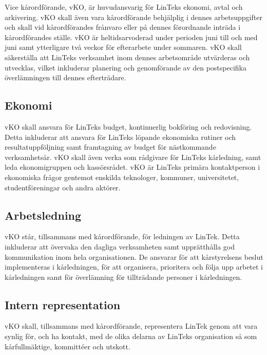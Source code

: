 Vice kårordförande, vKO, är huvudansvarig för LinTeks ekonomi, avtal och
arkivering. vKO skall även vara kårordförande behjälplig i dennes
arbetsuppgifter och skall vid kårordförandes frånvaro eller på dennes
förordnande inträda i kårordförandes ställe. vKO är heltidsarvoderad
under perioden juni till och med juni samt ytterligare två veckor för
efterarbete under sommaren. vKO skall säkerställa att LinTeks verksamhet
inom dennes arbetsområde utvärderas och utvecklas, vilket inkluderar
planering och genomförande av den postspecifika överlämningen till
dennes efterträdare.

\hypertarget{ekonomi}{%
\subsection{Ekonomi}\label{ekonomi}}

vKO skall ansvara för LinTeks budget, kontinuerlig bokföring och
redovisning. Detta inkluderar att ansvara för LinTeks löpande ekonomiska
rutiner och resultatuppföljning samt framtagning av budget för
nästkommande verksamhetsår. vKO skall även verka som rådgivare för
LinTeks kårledning, samt leda ekonomigruppen och kassörsrådet. vKO är
LinTeks primära kontaktperson i ekonomiska frågor gentemot enskilda
teknologer, kommuner, universitetet, studentföreningar och andra
aktörer.

\hypertarget{arbetsledning}{%
\subsection{Arbetsledning}\label{arbetsledning}}

vKO står, tillsammans med kårordförande, för ledningen av LinTek. Detta
inkluderar att övervaka den dagliga verksamheten samt upprätthålla god
kommunikation inom hela organisationen. De ansvarar för att
kårstyrelsens beslut implementeras i kårledningen, för att organisera,
prioritera och följa upp arbetet i kårledningen samt för överlämning för
tillträdande personer i kårledningen.

\hypertarget{intern-representation}{%
\subsection{Intern representation}\label{intern-representation}}

vKO skall, tillsammans med kårordförande, representera LinTek genom att
vara synlig för, och ha kontakt, med de olika delarna av LinTeks
organisation så som kårfullmäktige, kommittéer och utskott.

